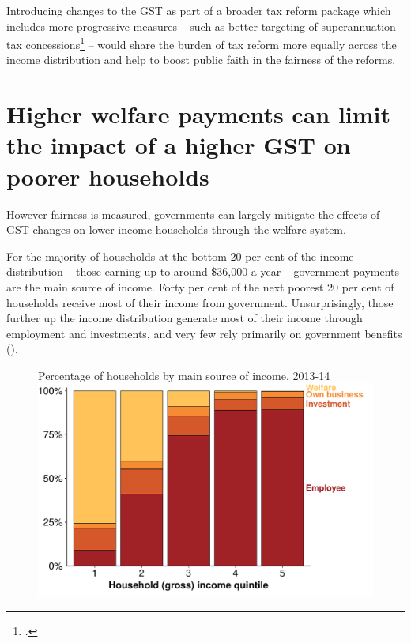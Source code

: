 \documentclass{grattanAlpha}
\begin{document}
Introducing changes to the GST as part of a broader tax reform package which includes more progressive measures – such as better targeting of superannuation tax concessions\footcite{DaleyCoatesWoodEtAl2015Super}  – would share the burden of tax reform more equally across the income distribution and help to boost public faith in the fairness of the reforms. 

\section{Higher welfare payments can limit the impact of a higher GST on poorer households}\label{sec:GST-3-2}
However fairness is measured, governments can largely mitigate the effects of GST changes on lower income households through the welfare system.

For the majority of households at the bottom 20 per cent of the income distribution – those earning up to around \$36,000 a year  – government payments are the main source of income. Forty per cent of the next poorest 20 per cent of households receive most of their income from government. Unsurprisingly, those further up the income distribution generate most of their income through employment and investments, and very few rely primarily on government benefits (). 

\begin{figure}
%
{Percentage of households by main source of income, 2013-14}
\includegraphics[width=\columnwidth]{atlas/figure/GST-Figure-5-1.pdf}

\end{figure}
\end{document}
